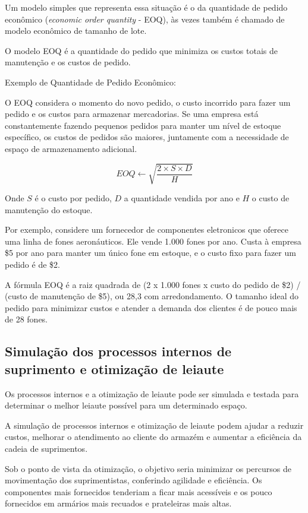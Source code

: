 \documentclass{article}
\begin{document}
Um modelo simples que representa essa situação é o da quantidade de pedido econômico ({\it economic order quantity} - EOQ), às vezes também é chamado de modelo econômico de tamanho de lote.

O modelo EOQ é a quantidade do pedido que minimiza os custos totais de manutenção e os custos de pedido.

Exemplo de Quantidade de Pedido Econômico:

O EOQ considera o momento do novo pedido, o custo incorrido para fazer um pedido e os custos para armazenar mercadorias. Se uma empresa está constantemente fazendo pequenos pedidos para manter um nível de estoque específico, os custos de pedidos são maiores, juntamente com a necessidade de espaço de armazenamento adicional.

\begin{equation} \label{eq:eoq}
	EOQ \gets \sqrt{\frac{2 \times S \times D}{H}}
\end{equation}

Onde $S$ é o custo por pedido, $D$ a quantidade vendida por ano e $H$ o custo de manutenção do estoque.

Por exemplo, considere um fornecedor de componentes eletronicos que oferece uma linha de fones aeronáuticos. Ele vende 1.000 fones por ano. Custa à empresa \$5 por ano para manter um único fone em estoque, e o custo fixo para fazer um pedido é de \$2.

A fórmula EOQ é a raiz quadrada de (2 x 1.000 fones x custo do pedido de \$2) / (custo de manutenção de \$5), ou 28,3 com arredondamento. O tamanho ideal do pedido para minimizar custos e atender a demanda dos clientes é de pouco mais de 28 fones.


\subsection{Simulação dos processos internos de suprimento e otimização de leiaute}

Os processos internos e a otimização de leiaute pode ser simulada e testada para determinar o melhor leiaute possível para um determinado espaço.

A simulação de processos internos e otimização de leiaute podem ajudar a reduzir custos, melhorar o atendimento ao cliente do armazém e aumentar a eficiência da cadeia de suprimentos.

Sob o ponto de vista da otimização, o objetivo seria minimizar os percursos de movimentação dos suprimentistas, conferindo agilidade e eficiência. Os componentes mais fornecidos tenderiam a ficar mais acessíveis e os pouco fornecidos em armários mais recuados e prateleiras mais altas.
\end{document}
